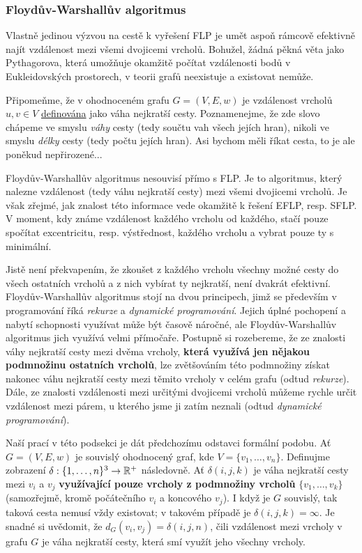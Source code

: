 \subsubsection{Floydův-Warshallův algoritmus}
\label{sssec:floyduv-warshalluv-algoritmus}

Vlastně jedinou výzvou na cestě k vyřešení FLP je umět aspoň rámcově efektivně
najít vzdálenost mezi všemi dvojicemi vrcholů. Bohužel, žádná pěkná věta jako
Pythagorova, která umožňuje okamžitě počítat vzdálenosti bodů v Eukleidovských
prostorech, v teorii grafů neexistuje a existovat nemůže.

Připomeňme, že v ohodnoceném grafu $G = (V,E,w)$ je vzdálenost vrcholů $u,v \in
V$ \hyperref[def:vzdalenost-v-grafu]{definována} jako váha nejkratší cesty.
Poznamenejme, že zde slovo  chápeme ve smyslu \emph{váhy} cesty
(tedy součtu vah všech jejích hran), nikoli ve smyslu \emph{délky} cesty (tedy
počtu jejích hran). Asi bychom měli říkat  cesta, to je ale poněkud
nepřirozené...

Floydův-Warshallův algoritmus nesouvisí přímo s FLP. Je to algoritmus, který
nalezne vzdálenost (tedy váhu nejkratší cesty) mezi všemi dvojicemi vrcholů. Je
však zřejmé, jak znalost této informace vede okamžitě k řešení EFLP, resp. SFLP.
V moment, kdy známe vzdálenost každého vrcholu od každého, stačí pouze spočítat
excentricitu, resp. výstřednost, každého vrcholu a vybrat pouze ty s minimální.

Jistě není překvapením, že zkoušet z každého vrcholu všechny možné cesty do
všech ostatních vrcholů a z nich vybírat ty nejkratší, není dvakrát efektivní.
Floydův-Warshallův algoritmus stojí na dvou principech, jimž se především v
programování říká \emph{rekurze} a \emph{dynamické programování}. Jejich úplné
pochopení a nabytí schopnosti využívat může být časově náročné, ale
Floydův-Warshallův algoritmus jich využívá velmi přímočaře. Postupně si
rozebereme, že ze znalosti váhy nejkratší cesty mezi dvěma vrcholy,
\textbf{která využívá jen nějakou podmnožinu ostatních vrcholů}, lze zvětšováním
této podmnožiny získat nakonec váhu nejkratší cesty mezi těmito vrcholy v celém
grafu (odtud \emph{rekurze}). Dále, ze znalosti vzdálenosti mezi určitými
dvojicemi vrcholů můžeme rychle určit vzdálenost mezi párem, u kterého jsme ji
zatím neznali (odtud \emph{dynamické programování}).

Naší prací v této podsekci je dát předchozímu odstavci formální podobu. Ať $G =
(V,E,w)$ je souvislý ohodnocený graf, kde $V = \{v_1,\ldots,v_n\}$. Definujme
zobrazení $\delta: \{1,\ldots,n\}^3 \to \mathbb{R}^+$ následovně. Ať $\delta(i,j,k)$
je váha nejkratší cesty mezi $v_i$ a $v_j$ \textbf{využívající pouze vrcholy z
podmnožiny vrcholů} $\{v_1,\ldots,v_k\}$ (samozřejmě, kromě počátečního $v_i$ a
koncového $v_j$). I když je $G$ souvislý, tak taková cesta nemusí vždy
existovat; v takovém případě je $\delta(i,j,k) = \infty$. Je snadné si uvědomit,
že $d_G(v_i,v_j) = \delta(i,j,n)$, čili vzdálenost mezi vrcholy v grafu $G$ je
váha nejkratší cesty, která smí využít jeho všechny vrcholy.

